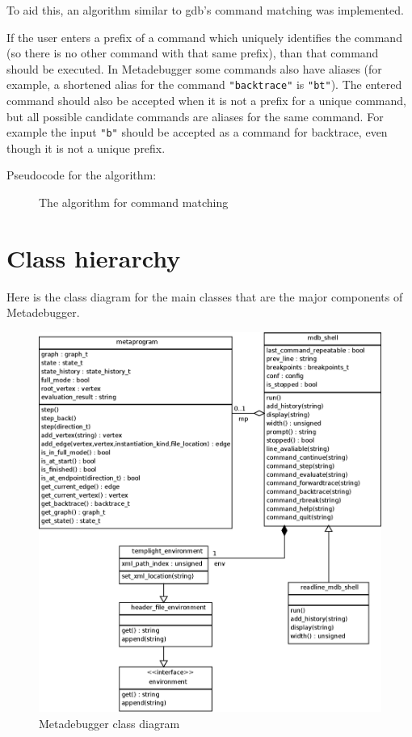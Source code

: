 To aid this, an algorithm similar to gdb's command matching was implemented.

If the user enters a prefix of a command which uniquely identifies the command
(so there is no other command with that same prefix), than that command should
be executed. In Metadebugger some commands also have aliases (for example, a
shortened alias for the command \texttt{"backtrace"} is \texttt{"bt"}). The
entered command should also be accepted when it is not a prefix for a unique
command, but all possible candidate commands are aliases for the same command.
For example the input \texttt{"b"} should be accepted as a command for
backtrace, even though it is not a unique prefix.

Pseudocode for the algorithm:

\begin{figure}[H]
    \caption{The algorithm for command matching}
\end{figure}

\pagebreak

\section{Class hierarchy}

Here is the class diagram for the main classes that are the major components of
Metadebugger.

\begin{figure}[H]
    \centering
    \includegraphics[width=\textwidth]{img/mdb_class_diagram.eps}
    \caption{Metadebugger class diagram}
\end{figure}


